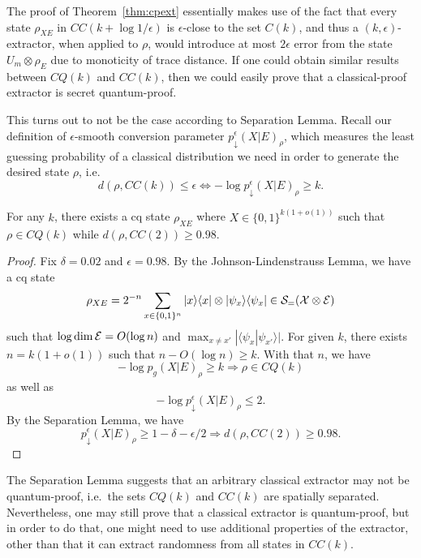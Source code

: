 The proof of Theorem~\ref{thm:cpext} essentially makes use of the fact that every state $\rho_{XE}$ in $CC(k+\log 1/\epsilon)$ is $\epsilon$-close to the set $C(k)$, and thus a $(k,\epsilon)$-extractor, when applied to $\rho$, would introduce at most $2\epsilon$ error from the state $U_m\otimes\rho_E$ due to monoticity of trace distance. If one could obtain similar results between $CQ(k)$ and $CC(k)$, then we could easily prove that a classical-proof extractor is secret quantum-proof.

This turns out to not be the case according to Separation Lemma. Recall our definition of $\epsilon$-smooth conversion parameter $p_{\downarrow}^{\epsilon}(X|E)_\rho$, which measures the least guessing probability of a classical distribution we need in order to generate the desired state $\rho$, i.e.\
$$d(\rho, CC(k))\leq \epsilon \Leftrightarrow -\log p_{\downarrow}^\epsilon(X|E)_\rho\geq k.$$

\begin{theorem}
    \label{thm:topsep}
    For any $k$, there exists a cq state $\rho_{XE}$ where $X\in\{0,1\}^{k(1+o(1))}$ such that $\rho\in CQ(k)$ while $d(\rho, CC(2))\geq 0.98$.
\end{theorem}
\begin{proof}

Fix $\delta = 0.02$ and $\epsilon = 0.98$. By the Johnson-Lindenstrauss Lemma, we have a cq state $$\rho_{XE}=2^{-n}\sum_{x\in\{0,1\}^n}|x\rangle\langle x|\otimes|\psi_x\rangle\langle \psi_x|\in\mathcal{S}_{=}(\mathcal{X}\otimes \mathcal{E})$$
such that $\log \dim \mathcal{E}=O(\log n)$ and $\max_{x\neq x'}|\langle \psi_x|\psi_{x'}\rangle|$. For given $k$, there exists $n=k(1+o(1))$ such that $n-O(\log n)\geq k$. With that $n$, we have 
$$-\log p_g(X|E)_\rho\geq k\Rightarrow \rho\in CQ(k)$$ as well as $$-\log p^{\epsilon}_{\downarrow}(X|E)_{\rho}\leq 2.$$ By the Separation Lemma, we have 
$$p_{\downarrow}^{\epsilon}(X|E)_\rho \geq 1-\delta-\epsilon/2\Rightarrow d(\rho,CC(2))\geq 0.98.$$ 
\end{proof}

The Separation Lemma suggests that an arbitrary classical extractor may not be quantum-proof, i.e.\ the sets $CQ(k)$ and $CC(k)$ are spatially separated. Nevertheless, one may still prove that a classical extractor is quantum-proof, but in order to do that, one might need to use additional properties of the extractor, other than that it can extract randomness from all states in $CC(k)$.

